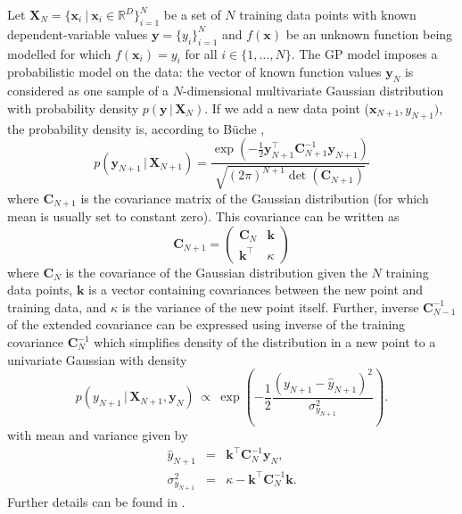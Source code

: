 \documentclass{itatnew}
\newcommand{\xx}{\mathrm{\mathbf{x}}}
\newcommand{\yy}{\mathrm{\mathbf{y}}}
\newcommand{\XX}{\mathrm{\mathbf{X}}}
\newcommand{\CC}{\mathrm{\mathbf{C}}}
\begin{document}
Let $\XX_N = \{\xx_i \ | \ \xx_i \in \mathbb{R}^{D}\}_{i=1}^{N}$ be a set of $N$ training data points with known dependent-variable values $\yy = \{y_i\}_{i=1}^{N}$ and $f(\xx)$ be an unknown function being modelled for which $f(\xx_i) = y_i$ for all $i \in \{1,\ldots,N\}$. The GP model imposes a probabilistic model on the data: the vector of known function values $\yy_N$ is considered as one sample of a $N$-dimensional multivariate Gaussian distribution with probability density $p(\yy \, | \, \XX_N)$. If we add a new data point ($\xx_{N+1}, y_{N+1})$, the probability density is, according to B\"{u}che \cite{buche_accelerating_2005},
\begin{equation}
p(\yy_{N+1} \, | \, \XX_{N+1}) = \frac { \exp(-\frac{1}{2} \yy^\top_{N+1} \CC^{-1}_{N+1} \yy_{N+1}) } { \sqrt{(2\pi)^{N+1} \det(\CC_{N+1})} }
\end{equation}
where $\CC_{N+1}$ is the covariance matrix of the Gaussian distribution (for which mean is usually set to constant zero). This covariance can be written as
\begin{equation}
\CC_{N+1} = \left( \begin{array}{cc} \CC_N & \mathbf{k} \\ \mathbf{k}^\top & \kappa \end{array} \right)
\end{equation}
where $\CC_N$ is the covariance of the Gaussian distribution given the $N$ training data points, $\mathbf{k}$ is a vector containing covariances between the new point and training data, and $\kappa$ is the variance of the new point itself. Further, inverse $\CC^{-1}_{N-1}$ of the extended covariance can be expressed using inverse of the training covariance $\CC^{-1}_N$ which simplifies density of the distribution in a new point to a univariate Gaussian with density
\begin{equation}
p(y_{N+1} \, | \, \XX_{N+1}, \yy_N) \ \varpropto \ \exp \left( -\frac{1}{2} \frac {(y_{N+1} - \hat{y}_{N+1})^2} {\sigma^2_{y_{N+1}}} \right)
\label{univariate-density}.
\end{equation}
with mean and variance given by
\begin{eqnarray}
\hat{y}_{N+1} & = & \mathbf{k}^\top \CC^{-1}_N \yy_N, \\
\sigma^2_{y_{N+1}} & = & \kappa - \mathbf{k}^\top \CC^{-1}_N \mathbf{k}.
\end{eqnarray}
Further details can be found in \cite{buche_accelerating_2005}.
\end{document}
